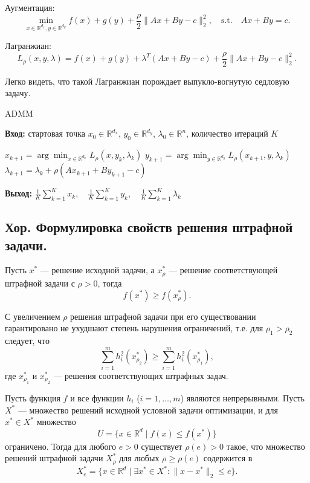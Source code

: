 Аугментация:
$$\min_{x \in \mathbb{R}^{d_x}, y \in \mathbb{R}^{d_y}} f(x) + g(y) + \frac{\rho}{2} \| Ax + By - c \|_2^2, \quad \text{s.t.} \quad Ax + By = c.$$

Лагранжиан:
$$L_{\rho}(x, y, \lambda) = f(x) + g(y) + \lambda^T (Ax + By - c) + \frac{\rho}{2} \| Ax + By - c \|_2^2.$$

\begin{note}
    Легко видеть, что такой Лагранжиан порождает выпукло-вогнутую седловую задачу.
\end{note}

\begin{algorithm}[H]
    \caption{ADMM}
    \textbf{Вход:} стартовая точка $x_0 \in \mathbb{R}^{d_x}$, $y_0 \in \mathbb{R}^{d_y}$, $\lambda_0 \in \mathbb{R}^n$, количество итераций $K$
    \begin{algorithmic}[1]
        \State $x_{k+1} = \arg \min_{x \in \mathbb{R}^{d_x}} L_{\rho}(x, y_k, \lambda_k)$
        \State $y_{k+1} = \arg \min_{y \in \mathbb{R}^{d_y}} L_{\rho}(x_{k+1}, y, \lambda_k)$
        \State $\lambda_{k+1} = \lambda_k + \rho (A x_{k+1} + B y_{k+1} - c)$
        \EndFor
    \end{algorithmic}
    \textbf{Выход:} $\frac{1}{K} \sum_{k=1}^{K} x_k, \quad \frac{1}{K} \sum_{k=1}^{K} y_k, \quad \frac{1}{K} \sum_{k=1}^{K} \lambda_k$
\end{algorithm}

\subsection{Хор. Формулировка свойств решения штрафной задачи.}

\begin{lemma}
    Пусть $x^*$ — решение исходной задачи, а $x^*_{\rho}$ — решение соответствующей штрафной задачи с $\rho > 0$, тогда
    $$f(x^*) \geq f(x^*_{\rho}).$$
\end{lemma}

\begin{lemma}
    С увеличением $\rho$ решения штрафной задачи при его существовании гарантировано не ухудшают степень нарушения ограничений, т.е. для $\rho_1 > \rho_2$ следует, что
    $$\sum_{i=1}^{m} h_i^2(x^*_{\rho_2}) \geq \sum_{i=1}^{m} h_i^2(x^*_{\rho_1}),$$
    где $x^*_{\rho_1}$ и $x^*_{\rho_2}$ — решения соответствующих штрафных задач.
\end{lemma}

\begin{lemma}
    Пусть функция $f$ и все функции $h_i$ ($i = 1, \dots, m$) являются непрерывными. Пусть $X^*$ — множество решений исходной условной задачи оптимизации, и для $x^* \in X^*$ множество
    $$U = \{x \in \mathbb{R}^d \mid f(x) \leq f(x^*)\}$$
    ограничено.
    Тогда для любого $e > 0$ существует $\rho(e) > 0$ такое, что множество решений штрафной задачи $X^*_\rho$ для любых $\rho \geq \rho(e)$ содержится в
    $$X^*_e = \{x \in \mathbb{R}^d \mid \exists x^* \in X^* : \|x - x^*\|_2 \leq e\}.$$
\end{lemma}
